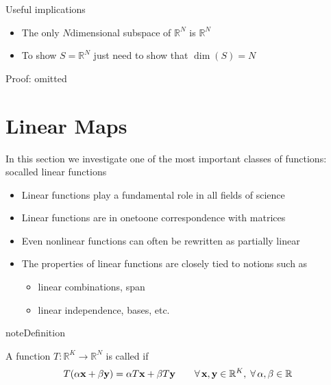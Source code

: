 \documentclass[letterpaper,10pt,english]{jupyterBook}
\begin{document}
\sphinxAtStartPar
Useful implications
\begin{itemize}
\item {} 
\sphinxAtStartPar
The only \(N\)\sphinxhyphen{}dimensional subspace of \(\mathbb{R}^N\) is \(\mathbb{R}^N\)

\item {} 
\sphinxAtStartPar
To show \(S = \mathbb{R}^N\) just need to show that \(\dim(S) = N\)

\end{itemize}

\sphinxAtStartPar
Proof: omitted


\section{Linear Maps}
\label{\detokenize{05.linear_algebra:linear-maps}}
\sphinxAtStartPar
In this section we investigate one of the most important classes of functions: so\sphinxhyphen{}called linear functions
\begin{itemize}
\item {} 
\sphinxAtStartPar
Linear functions play a fundamental role in all fields of science

\item {} 
\sphinxAtStartPar
Linear functions are in one\sphinxhyphen{}to\sphinxhyphen{}one correspondence with matrices

\item {} 
\sphinxAtStartPar
Even nonlinear functions can often be rewritten as partially linear

\item {} 
\sphinxAtStartPar
The properties of linear functions are closely tied to notions such as
\begin{itemize}
\item {} 
\sphinxAtStartPar
linear combinations, span

\item {} 
\sphinxAtStartPar
linear independence, bases, etc.

\end{itemize}

\end{itemize}

\begin{sphinxadmonition}{note}{Definition}

\sphinxAtStartPar
A function \(T \colon \mathbb{R}^K \to \mathbb{R}^N\) is called
 if
\begin{equation*}
\begin{split}
%
T(\alpha {\bf x} + \beta {\bf y}) = \alpha T{\bf x} + \beta T{\bf y}
\qquad
\forall \, 
{\bf x}, {\bf y} \in \mathbb{R}^K, \;
\forall \,
\alpha, \beta \in \mathbb{R}
%
\end{split}
\end{equation*}\end{sphinxadmonition}
\end{document}

